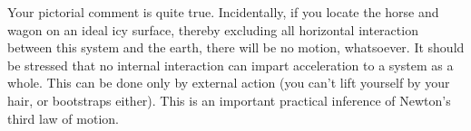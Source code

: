 \begin{p}
Your pictorial comment is quite true. Incidentally, if you locate the horse and wagon on an ideal icy surface, thereby excluding all horizontal interaction between this system and the earth, there will be no motion, whatsoever. It should be stressed that no internal interaction can impart acceleration to a system as a whole. This can be done only by external action (you can't lift yourself by your hair, or bootstraps either). This is an important practical inference of Newton's third law of motion.
\end{p}











